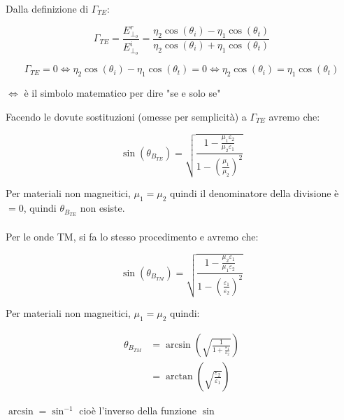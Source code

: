 Dalla definizione di $\Gamma_{TE}$: 

{\Large \begin{equation}
    \Gamma_{TE} = \frac{E_{\perp_o}^{r}}{E_{\perp_o}^{i}} = \frac{\eta_2 \cos(\theta_i) - \eta_1 \cos(\theta_t)}{\eta_2 \cos(\theta_i) + \eta_1 \cos(\theta_t)}
\end{equation}}

{\Large \begin{equation}
    \Gamma_{TE} = 0 \iff \eta_2 \cos(\theta_i) - \eta_1 \cos(\theta_t) = 0 
    \iff \eta_2 \cos(\theta_i) = \eta_1 \cos(\theta_t)
\end{equation}} 


\begin{tcolorbox}
    $\iff$ è il simbolo matematico per dire "se e solo se"
\end{tcolorbox}

Facendo le dovute sostituzioni (omesse per semplicità) a $\Gamma_{TE}$ avremo che: 

{\Large \begin{equation}
    \sin(\theta_{B_{TE}}) = \sqrt{\frac{1 - \frac{\mu_1 \varepsilon_2}{\mu_2 \varepsilon_1}}{1 - (\frac{\mu_1}{\mu_2} )^{2}}}
\end{equation}} 

Per materiali non magneitici, $\mu_1 = \mu_2 $ quindi il denominatore della divisione è $=0$, 
quindi $\theta_{B_{TE}}$ non esiste. \\ \\ 

Per le onde TM, si fa lo stesso procedimento e avremo che: 

{\Large \begin{equation}
    \sin(\theta_{B_{TM}}) = \sqrt{\frac{1 - \frac{\mu_2 \varepsilon_1}{\mu_1 \varepsilon_2}}{1 - (\frac{\varepsilon_1}{\varepsilon_2} )^{2}}}
\end{equation}} 

Per materiali non magneitici, $\mu_1 = \mu_2$ quindi: 

{\Large \begin{equation}
    \begin{split}
        \theta_{B_{TM}} 
        &= \arcsin(\sqrt{\frac{1}{1 + \frac{\varepsilon_1}{\varepsilon_2}}}) 
        \\
        &= \arctan (\sqrt{\frac{\varepsilon_2}{\varepsilon_1}}) 
    \end{split}
\end{equation}}

\begin{tcolorbox}
    $\arcsin = \sin ^{-1}$ cioè l'inverso della funzione $\sin$
\end{tcolorbox}



